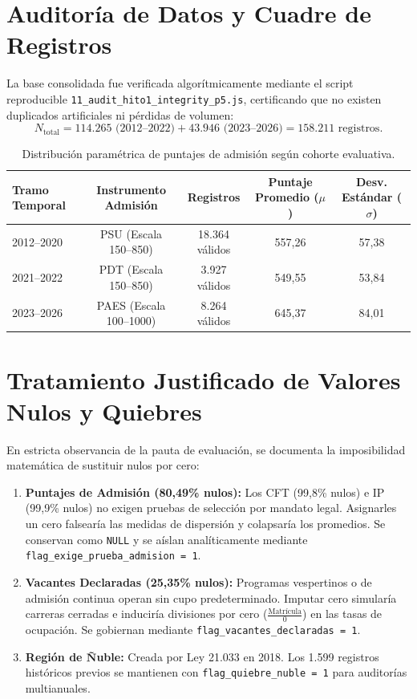 \documentclass[11pt,a4paper]{article}
\begin{document}
\section{Auditoría de Datos y Cuadre de Registros}
La base consolidada fue verificada algorítmicamente mediante el script reproducible \texttt{11\_audit\_hito1\_integrity\_p5.js}, certificando que no existen duplicados artificiales ni pérdidas de volumen:
\begin{equation}
    N_{\text{total}} = 114.265 \text{ (2012--2022)} + 43.946 \text{ (2023--2026)} = 158.211 \text{ registros.}
\end{equation}

\begin{table}[h!]
\centering
\small
\begin{tabular}{lcccc}
\toprule
\textbf{Tramo Temporal} & \textbf{Instrumento Admisión} & \textbf{Registros} & \textbf{Puntaje Promedio ($\mu$)} & \textbf{Desv. Estándar ($\sigma$)} \\
\midrule
2012--2020 & PSU (Escala 150--850) & 18.364 válidos & 557,26 & 57,38 \\
2021--2022 & PDT (Escala 150--850) & 3.927 válidos & 549,55 & 53,84 \\
2023--2026 & PAES (Escala 100--1000) & 8.264 válidos & 645,37 & 84,01 \\
\bottomrule
\end{tabular}
\caption{Distribución paramétrica de puntajes de admisión según cohorte evaluativa.}
\label{tab:puntajes}
\end{table}

\section{Tratamiento Justificado de Valores Nulos y Quiebres}
En estricta observancia de la pauta de evaluación, se documenta la imposibilidad matemática de sustituir nulos por cero:
\begin{enumerate}
    \item \textbf{Puntajes de Admisión (80,49\% nulos):} Los CFT (99,8\% nulos) e IP (99,9\% nulos) no exigen pruebas de selección por mandato legal. Asignarles un cero falsearía las medidas de dispersión y colapsaría los promedios. Se conservan como \texttt{NULL} y se aíslan analíticamente mediante \texttt{flag\_exige\_prueba\_admision = 1}.
    \item \textbf{Vacantes Declaradas (25,35\% nulos):} Programas vespertinos o de admisión continua operan sin cupo predeterminado. Imputar cero simularía carreras cerradas e induciría divisiones por cero ($\frac{\text{Matrícula}}{0}$) en las tasas de ocupación. Se gobiernan mediante \texttt{flag\_vacantes\_declaradas = 1}.
    \item \textbf{Región de Ñuble:} Creada por Ley 21.033 en 2018. Los 1.599 registros históricos previos se mantienen con \texttt{flag\_quiebre\_nuble = 1} para auditorías multianuales.
\end{enumerate}
\end{document}
